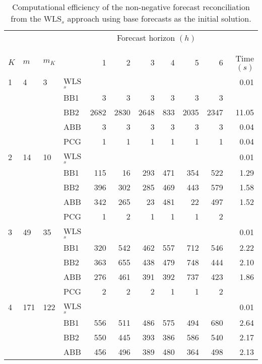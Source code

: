 \documentclass[11pt]{article}
\newcommand{\0}{\phantom{0}}
\begin{document}
\begin{table}[ht]
	\small
	\tabcolsep=0.20cm
	\caption{Computational efficiency of the non-negative forecast reconciliation from the WLS$_{s}$ approach using base forecasts as the initial solution.}
	\label{tbl:perfnnwlsb}
	\centering
	\begin{threeparttable}
		\begin{tabular}{llllrrrrrrr}
			\toprule
			& & & & \multicolumn{6}{c}{Forecast horizon $(h)$}\\[-0.3cm]\\\cline{5-10}\\[-0.3cm]
			$K$ & $m$ & $m_{K}$ & & 1 & 2 & 3 & 4 & 5 & 6 & Time $(s)$\\
			\midrule
			1 & 4 & 3 & WLS$_{s}$ & & & & & & & 0.01 \\
			& & & BB1 & 3 & 3 & 3 & 3 & 3 & 3 & \pmb{$0.03$} \\
			& & & BB2 & 2682 & 2830 & 2648 & 833 & 2035 & 2347 & 11.05 \\
			& & & ABB & 3 & 3 & 3 & 3 & 3 & 3 & 0.04 \\
			& & & PCG & 1 & 1 & 1 & 1 & 1 & 1 & 0.04 \\
			\midrule
			2 & 14 & 10 & WLS$_{s}$ & & & & & & & 0.01\\
			& & & BB1 & 115 & 16 & 293 & 471 & 354 & 522 & 1.29 \\			
			& & & BB2 & 396 & 302 & 285 & 469 & 443 & 579 & 1.58 \\
			& & & ABB & 342 & 265 & 23 & 481 & 22 & 497 & 1.52 \\
			& & & PCG & 1 & 2 & 1 & 1 & 1 & 2 & \pmb{$0.10$} \\
			\midrule
			3 & 49 & 35 & WLS$_{s}$ & & & & & & & 0.01 \\
			& & & BB1 & 320 & 542 & 462 & 557 & 712 & 546 & 2.22 \\
			& & & BB2 & 363 & 655 & 438 & 479 & 748 & 444 & 2.10 \\
			& & & ABB & 276 & 461 & 391 & 392 & 737 & 423 & 1.86 \\
			& & & PCG & 2 & 2 & 2 & 1 & 1 & 2 & \pmb{$0.17$} \\
			\midrule		
			4 & 171 & 122 & WLS$_{s}$ & & & & & & & 0.01 \\
			& & & BB1 & 556 & 511 & 486 & 575 & 494 & 680 & 2.64 \\
			& & & BB2 & 550 & 445 & 393 & 386 & 586 & 540 & 2.17 \\
			& & & ABB & 456 & 496 & 389 & 480 & 364 & 498 & 2.13 \\

\end{tabular}
\end{threeparttable}
\end{table}
\end{document}
